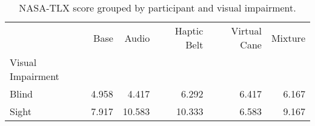 
\begin{table}[!htb]
\centering
\caption{NASA-TLX score grouped by participant and visual impairment.}
\label{tab:nasa_average_group}
\begin{tabular}{lrrrrr}
\toprule
{} &  Base &  Audio &  Haptic Belt &  Virtual Cane &  Mixture \\
Visual Impairment &       &        &              &               &          \\
\midrule
Blind             & 4.958 &  4.417 &        6.292 &         6.417 &    6.167 \\
Sight             & 7.917 & 10.583 &       10.333 &         6.583 &    9.167 \\
\bottomrule
\end{tabular}
\end{table}

